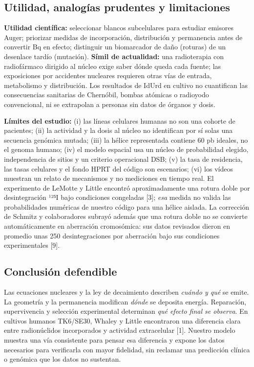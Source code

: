 \documentclass[11pt,a4paper,oneside]{article}
\begin{document}
\subsection{Utilidad, analogías prudentes y limitaciones}\label{utilidad-analoguxedas-prudentes-y-limitaciones}

\textbf{Utilidad científica:} seleccionar blancos subcelulares para estudiar emisores Auger; priorizar medidas de incorporación, distribución y permanencia antes de convertir Bq en efecto; distinguir un biomarcador de daño (roturas) de un desenlace tardío (mutación). \textbf{Símil de actualidad:} una radioterapia con radiofármaco dirigido al núcleo exige saber dónde queda cada fuente; las exposiciones por accidentes nucleares requieren otras vías de entrada, metabolismo y distribución. Los resultados de IdUrd en cultivo no cuantifican las consecuencias sanitarias de Chernóbil, bombas atómicas o radioyodo convencional, ni se extrapolan a personas sin datos de órganos y dosis.

\textbf{Límites del estudio:} (i) las líneas celulares humanas no son una cohorte de pacientes; (ii) la actividad y la dosis al núcleo no identifican por sí solas una secuencia genómica mutada; (iii) la hélice representada contiene 60 pb ideales, no el genoma humano; (iv) el modelo espacial usa un núcleo de probabilidad elegido, independencia de sitios y un criterio operacional DSB; (v) la tasa de residencia, las tasas celulares y el fondo HPRT del código son escenarios; (vi) los vídeos muestran un relato de mecanismos y no mediciones en tiempo real. El experimento de LeMotte y Little encontró aproximadamente una rotura doble por desintegración ¹²⁵I bajo condiciones congeladas {[}3{]}; \emph{esa} medida no valida las probabilidades numéricas de nuestro código para una hélice aislada. La corrección de Schmitz y colaboradores subrayó además que una rotura doble no se convierte automáticamente en aberración cromosómica: sus datos revisados dieron en promedio unas 250 desintegraciones por aberración bajo sus condiciones experimentales {[}9{]}.

\subsection{Conclusión defendible}\label{conclusiuxf3n-defendible}

Las ecuaciones nucleares y la ley de decaimiento describen \emph{cuándo y qué} se emite. La geometría y la permanencia modifican \emph{dónde} se deposita energía. Reparación, supervivencia y selección experimental determinan \emph{qué efecto final se observa}. En cultivos humanos TK6/SE30, Whaley y Little encontraron una diferencia clara entre radionúclidos incorporados y actividad extracelular {[}1{]}. Nuestro modelo muestra una vía consistente para pensar esa diferencia y expone los datos necesarios para verificarla con mayor fidelidad, sin reclamar una predicción clínica o genómica que los datos no sustentan.
\end{document}
